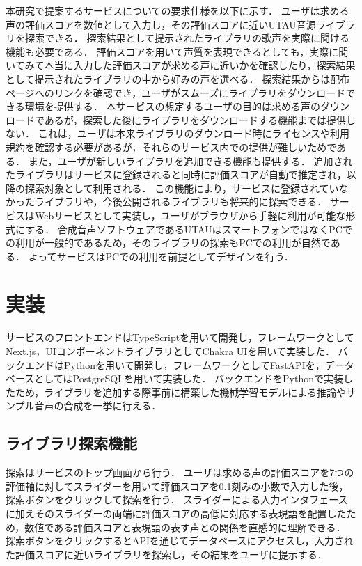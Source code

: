 本研究で提案するサービスについての要求仕様を以下に示す．
ユーザは求める声の評価スコアを数値として入力し，その評価スコアに近いUTAU音源ライブラリを探索できる．
探索結果として提示されたライブラリの歌声を実際に聞ける機能も必要である．
評価スコアを用いて声質を表現できるとしても，実際に聞いてみて本当に入力した評価スコアが求める声に近いかを確認したり，探索結果として提示されたライブラリの中から好みの声を選べる．
探索結果からは配布ページへのリンクを確認でき，ユーザがスムーズにライブラリをダウンロードできる環境を提供する．
本サービスの想定するユーザの目的は求める声のダウンロードであるが，探索した後にライブラリをダウンロードする機能までは提供しない．
これは，ユーザは本来ライブラリのダウンロード時にライセンスや利用規約を確認する必要があるが，それらのサービス内での提供が難しいためである．
また，ユーザが新しいライブラリを追加できる機能も提供する．
追加されたライブラリはサービスに登録されると同時に評価スコアが自動で推定され，以降の探索対象として利用される．
この機能により，サービスに登録されていなかったライブラリや，今後公開されるライブラリも将来的に探索できる．
サービスはWebサービスとして実装し，ユーザがブラウザから手軽に利用が可能な形式にする．
合成音声ソフトウェアであるUTAUはスマートフォンではなくPCでの利用が一般的であるため，そのライブラリの探索もPCでの利用が自然である．
よってサービスはPCでの利用を前提としてデザインを行う．

\section{実装}
サービスのフロントエンドはTypeScriptを用いて開発し，フレームワークとしてNext.js，UIコンポーネントライブラリとしてChakra UIを用いて実装した．
バックエンドはPythonを用いて開発し，フレームワークとしてFastAPIを，データベースとしてはPostgreSQLを用いて実装した．
バックエンドをPythonで実装したため，ライブラリを追加する際事前に構築した機械学習モデルによる推論やサンプル音声の合成を一挙に行える．

\subsection{ライブラリ探索機能}

探索はサービスのトップ画面から行う．
ユーザは求める声の評価スコアを7つの評価軸に対してスライダーを用いて評価スコアを0.1刻みの小数で入力した後，探索ボタンをクリックして探索を行う．
スライダーによる入力インタフェースに加えそのスライダーの両端に評価スコアの高低に対応する表現語を配置したため，数値である評価スコアと表現語の表す声との関係を直感的に理解できる．
探索ボタンをクリックするとAPIを通じてデータベースにアクセスし，入力された評価スコアに近いライブラリを探索し，その結果をユーザに提示する．

